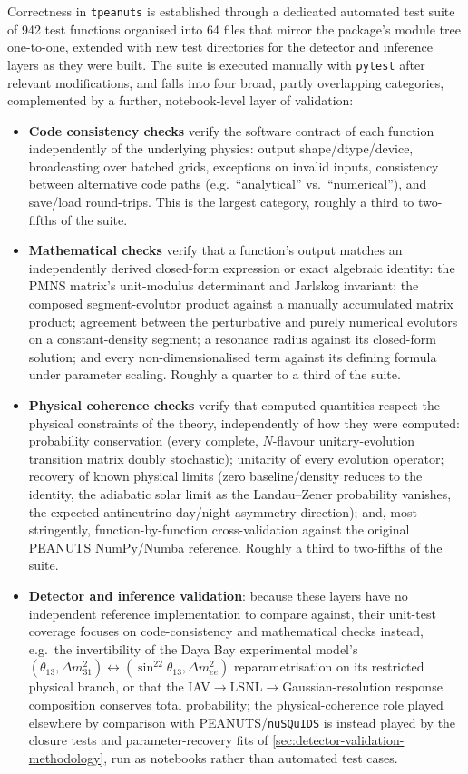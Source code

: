 Correctness in \texttt{tpeanuts} is established through a dedicated automated test suite of 942 test functions organised into 64 files that mirror the package's module tree one-to-one, extended with new test directories for the detector and inference layers as they were built. The suite is executed manually with \texttt{pytest} after relevant modifications, and falls into four broad, partly overlapping categories, complemented by a further, notebook-level layer of validation:

\begin{itemize}
  \item \textbf{Code consistency checks} verify the software contract of each function independently of the underlying physics: output shape/dtype/device, broadcasting over batched grids, exceptions on invalid inputs, consistency between alternative code paths (e.g.\ \enquote{analytical} vs.\ \enquote{numerical}), and save/load round-trips. This is the largest category, roughly a third to two-fifths of the suite.
  \item \textbf{Mathematical checks} verify that a function's output matches an independently derived closed-form expression or exact algebraic identity: the PMNS matrix's unit-modulus determinant and Jarlskog invariant; the composed segment-evolutor product against a manually accumulated matrix product; agreement between the perturbative and purely numerical evolutors on a constant-density segment; a resonance radius against its closed-form solution; and every non-dimensionalised term against its defining formula under parameter scaling. Roughly a quarter to a third of the suite.
  \item \textbf{Physical coherence checks} verify that computed quantities respect the physical constraints of the theory, independently of how they were computed: probability conservation (every complete, \(N\)-flavour unitary-evolution transition matrix doubly stochastic); unitarity of every evolution operator; recovery of known physical limits (zero baseline/density reduces to the identity, the adiabatic solar limit as the Landau--Zener probability vanishes, the expected antineutrino day/night asymmetry direction); and, most stringently, function-by-function cross-validation against the original PEANUTS NumPy/Numba reference. Roughly a third to two-fifths of the suite.
  \item \textbf{Detector and inference validation}: because these layers have no independent reference implementation to compare against, their unit-test coverage focuses on code-consistency and mathematical checks instead, e.g.\ the invertibility of the Daya Bay experimental model's \((\theta_{13},\Delta m^2_{31})\leftrightarrow(\sin^22\theta_{13},\Delta m^2_{ee})\) reparametrisation on its restricted physical branch, or that the IAV$\to$LSNL$\to$Gaussian-resolution response composition conserves total probability; the physical-coherence role played elsewhere by comparison with PEANUTS/\texttt{nuSQuIDS} is instead played by the closure tests and parameter-recovery fits of \cref{sec:detector-validation-methodology}, run as notebooks rather than automated test cases.

\end{itemize}
